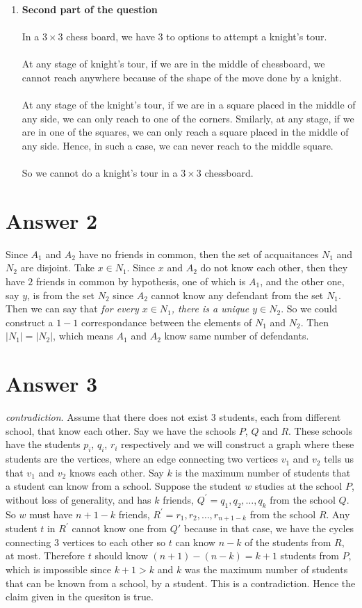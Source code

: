 \documentclass[12pt]{article}
\begin{document}
\begin{enumerate}
\item{\textbf{Second part of the question}}\\ \\
In a $3\times 3$ chess board, we have $3$ to options to attempt a knight's tour.\\ \\
At any stage of knight's tour, if we are in the middle of chessboard, we cannot reach anywhere because of the shape of the move done by a knight.\\ \\
At any stage of the knight's tour, if we are in a square placed in the middle of any side, we can only reach to one of the corners. Smilarly, at any stage, if we are in one of the squares, we can only reach a square placed in the middle of any side. Hence, in such a case, we can never reach to the middle square.\\ \\
So we cannot do a knight's tour in a $3\times 3$ chessboard.

\end{enumerate}

\section*{Answer 2}
Since $A_1$ and $A_2$ have no friends in common, then the set of acquaitances $N_1$ and $N_2$ are disjoint. Take $x\in N_1$. Since $x$ and $A_2$ do not know each other, then they have $2$ friends in common by hypothesis, one of which is $A_1$, and the other one, say $y$, is from the set $N_2$ since $A_2$ cannot know any defendant from the set $N_1$. Then we can say that \textit{for every $x\in N_1$, there is a unique $y\in N_2$}. So we could construct a $1-1$ correspondance between the elements of $N_1$ and $N_2$. Then $|N_1|=|N_2|$, which means $A_1$ and $A_2$ know same number of defendants.
\section*{Answer 3}

\textit{contradiction}. Assume that there does not exist $3$ students, each from different school, that know each other. Say we have the schools $P$, $Q$ and $R$. These schools have the students $p_i$, $q_i$, $r_i$ respectively and we will construct a graph where these students are the vertices, where an edge connecting two vertices $v_1$ and $v_2$ tells us that $v_1$ and $v_2$ knows each other. Say $k$ is the maximum number of students that a student can know from a school. Suppose the student $w$ studies at the school $P$, without loss of generality, and has $k$ friends, $Q^{'}=q_1,q_2,\dots,q_k$ from the school $Q$. So $w$ must have $n+1-k$ friends, $R^{'}=r_1,r_2,\dots,r_{n+1-k}$ from the school $R$. Any student $t$ in $R^{'}$ cannot know one from $Q'$ because in that case, we have the cycles connecting $3$ vertices to each other so $t$ can know $n-k$ of the students from $R$, at most. Therefore $t$ should know $(n+1)-(n-k)=k+1$ students from $P$, which is impossible since $k+1>k$ and $k$ was the maximum number of students that can be known from a school, by a student. This is a contradiction. Hence the claim given in the quesiton is true.
\end{document}
